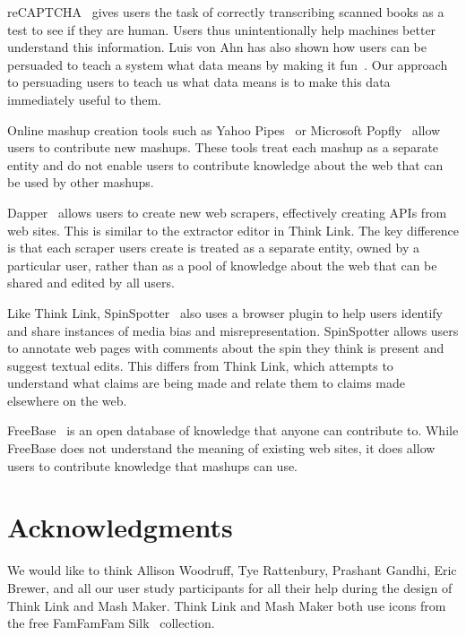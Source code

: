 \documentclass{chi2009}
\begin{document}
reCAPTCHA~\cite{recaptcha} gives users the task of correctly transcribing scanned books as a test to see if they are human. Users thus unintentionally help machines better understand this information. Luis von Ahn has also shown how users can be persuaded to teach a system what data means by making it fun~\cite{vonahn}. Our approach to persuading users to teach us what data means is to make this data immediately useful to them.

Online mashup creation tools such as Yahoo Pipes~\cite{pipes} or Microsoft Popfly~\cite{popfly} allow users to contribute new mashups. These tools treat each mashup as a separate entity and do not enable users to contribute knowledge about the web that can be used by other mashups.

Dapper~\cite{dapper} allows users to create new web scrapers, effectively creating APIs from web sites. This is similar to the extractor editor in Think Link. The key difference is that each scraper users create is treated as a separate entity, owned by a particular user, rather than as a pool of knowledge about the web that can be shared and edited by all users.

Like Think Link, SpinSpotter~\cite{spinspotter} also uses a browser plugin to help users identify and share instances of media bias and misrepresentation. SpinSpotter allows users to annotate web pages with comments about the spin they think is present and suggest textual edits. This differs from Think Link, which attempts to understand what claims are being made and relate them to claims made elsewhere on the web.

FreeBase~\cite{freebase} is an open database of knowledge that anyone can contribute to. While FreeBase does not understand the meaning of existing web sites, it does allow users to contribute knowledge that mashups can use.



\section{Acknowledgments}

We would like to think Allison Woodruff, Tye Rattenbury, Prashant Gandhi, Eric Brewer, and all our user study participants for all their help during the design of Think Link and Mash Maker. Think Link and Mash Maker both use icons from the free FamFamFam Silk~\cite{silkicons} collection.



\end{document}
